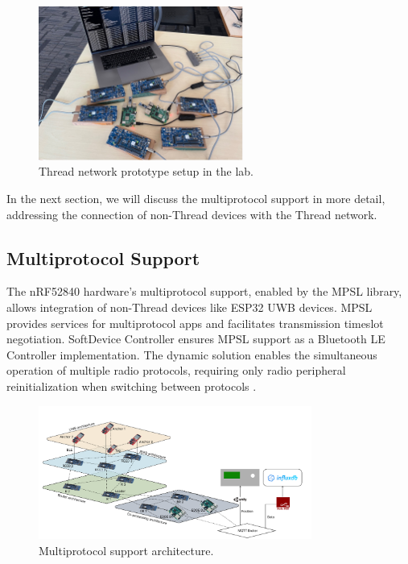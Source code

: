 \begin{figure}[h]
    \centering
    \includegraphics[width=0.6\textwidth]{images/research_design/prototype_setup.jpg}
    \caption{Thread network prototype setup in the lab.}
    \label{fig:prototype_setup}
\end{figure}

In the next section, we will discuss the multiprotocol support in more detail, addressing the connection of non-Thread devices with the Thread network.


\subsection{Multiprotocol Support}\label{sec:multiprotocol_support}
The nRF52840 hardware’s multiprotocol support, enabled by the MPSL library, allows integration of non-Thread devices like ESP32 UWB devices. MPSL provides services for multiprotocol apps and facilitates transmission timeslot negotiation. SoftDevice Controller ensures MPSL support as a Bluetooth LE Controller implementation. The dynamic solution enables the simultaneous operation of multiple radio protocols, requiring only radio peripheral reinitialization when switching between protocols \cite{nordic_multiprotocol_support}.

\begin{figure}[h]
    \centering
    \includegraphics[width=0.8\textwidth]{images/research_design/multiprotocol_support.png}
    \caption{Multiprotocol support architecture.}
    \label{fig:multiprotocol_support}
\end{figure}

